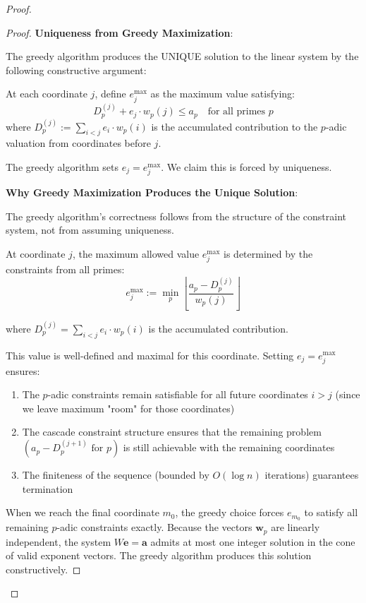 \begin{proof}
\begin{theorem}
\begin{proof}
\noindent \textbf{Uniqueness from Greedy Maximization}:

The greedy algorithm produces the UNIQUE solution to the linear system by the following constructive argument:

At each coordinate $j$, define $e_j^{\max}$ as the maximum value satisfying:
\begin{equation}
D_p^{(j)} + e_j \cdot w_p(j) \leq a_p \quad \text{for all primes } p
\end{equation}
where $D_p^{(j)} := \sum_{i < j} e_i \cdot w_p(i)$ is the accumulated contribution to the $p$-adic valuation from coordinates before $j$.

The greedy algorithm sets $e_j = e_j^{\max}$. We claim this is forced by uniqueness.

\noindent \textbf{Why Greedy Maximization Produces the Unique Solution}:

The greedy algorithm's correctness follows from the structure of the constraint system, not from assuming uniqueness.

At coordinate $j$, the maximum allowed value $e_j^{\max}$ is determined by the constraints from all primes:
\begin{equation}
e_j^{\max} := \min_p \left\lfloor \frac{a_p - D_p^{(j)}}{w_p(j)} \right\rfloor
\end{equation}

where $D_p^{(j)} = \sum_{i < j} e_i \cdot w_p(i)$ is the accumulated contribution.

This value is well-defined and maximal for this coordinate. Setting $e_j = e_j^{\max}$ ensures:
\begin{enumerate}
\item The $p$-adic constraints remain satisfiable for all future coordinates $i > j$ (since we leave maximum "room" for those coordinates)
\item The cascade constraint structure ensures that the remaining problem $(a_p - D_p^{(j+1)} \text{ for } p)$ is still achievable with the remaining coordinates
\item The finiteness of the sequence (bounded by $O(\log n)$ iterations) guarantees termination
\end{enumerate}

When we reach the final coordinate $m_0$, the greedy choice forces $e_{m_0}$ to satisfy all remaining $p$-adic constraints exactly. Because the vectors $\mathbf{w}_p$ are linearly independent, the system $W \mathbf{e} = \mathbf{a}$ admits at most one integer solution in the cone of valid exponent vectors. The greedy algorithm produces this solution constructively.


\end{proof}
\end{theorem}
\end{proof}
